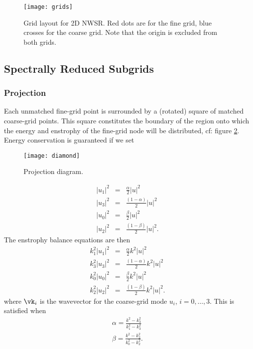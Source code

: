 \documentclass[10pt,showpacs,showkeys,%
amsfonts,amsmath,
onecolumn,
floatfix,aps,superscriptaddress]{revtex4}
\begin{document}
\begin{figure}[htb]
  \begin{center}
    \texttt{[image: grids]}
    \caption{Grid layout for 2D NWSR. Red dots are for the fine grid, blue
crosses for the coarse grid. Note that the origin is excluded from both grids.}
    \label{grids}
  \end{center}
\end{figure}

\subsection{Spectrally Reduced Subgrids}
\subsubsection{Projection}
Each unmatched fine-grid point is surrounded by a (rotated) square of matched
coarse-grid points. This square constitutes the boundary of the region onto
which the energy and enstrophy of the fine-grid node will be distributed, 
cf: figure \ref{diamond}. Energy conservation is guaranteed if we 
set 
\begin{figure}[htb]
  \begin{center}
    \texttt{[image: diamond]}
    \caption{Projection diagram.}
    \label{diamond}
  \end{center}
\end{figure}
\begin{eqnarray}
  |u_1|^2 &=& \frac{\alpha}{2} |u|^2 
  \\
  |u_3|^2 &=& \frac{(1-\alpha)}{2} |u|^2 
  \\
  |u_0|^2 &=& \frac{\beta}{2} |u|^2 
  \\
  |u_2|^2 &=& \frac{(1-\beta)}{2} |u|^2.
\end{eqnarray}
The enstrophy balance equations are then
\begin{eqnarray}
  k_1^2 |u_1|^2 &=& \frac{\alpha}{2} k^2|u|^2 
  \\
  k_3^2|u_3|^2 &=& \frac{(1-\alpha)}{2} k^2|u|^2 
  \\
  k_0^2|u_0|^2 &=& \frac{\beta}{2} k^2|u|^2 
  \\
  k_2^2|u_2|^2 &=& \frac{(1-\beta)}{2} k^2|u|^2.
\end{eqnarray}
where $\vk_i$ is the wavevector for the coarse-grid mode $u_i$, $i=0,\dots,3$.
This is satisfied when
\begin{eqnarray}
  \alpha = \frac{k^2 -k_3^2}{ k_1^2 -k_3^2}
  \\
  \beta = \frac{k^2 -k_2^2}{ k_0^2 -k_2^2}.
\end{eqnarray}
\end{document}
